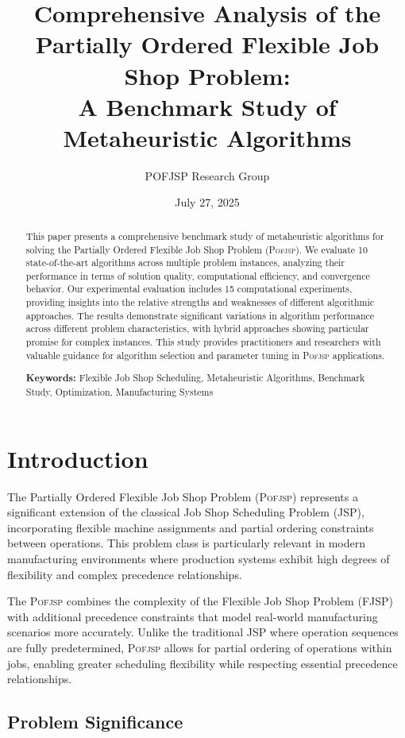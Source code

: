 \documentclass[11pt,a4paper]{article}
\title{Comprehensive Analysis of the Partially Ordered Flexible Job Shop Problem: \\
A Benchmark Study of Metaheuristic Algorithms}
\author{POFJSP Research Group}
\date{July 27, 2025}
\newcommand{\pofjsp}{\textsc{Pofjsp}}
\begin{document}
\maketitle


\begin{abstract}
This paper presents a comprehensive benchmark study of metaheuristic algorithms for solving the Partially Ordered Flexible Job Shop Problem (\pofjsp). We evaluate 10 state-of-the-art algorithms across multiple problem instances, analyzing their performance in terms of solution quality, computational efficiency, and convergence behavior. Our experimental evaluation includes 15 computational experiments, providing insights into the relative strengths and weaknesses of different algorithmic approaches. The results demonstrate significant variations in algorithm performance across different problem characteristics, with hybrid approaches showing particular promise for complex instances. This study provides practitioners and researchers with valuable guidance for algorithm selection and parameter tuning in \pofjsp{} applications.

\textbf{Keywords:} Flexible Job Shop Scheduling, Metaheuristic Algorithms, Benchmark Study, Optimization, Manufacturing Systems
\end{abstract}


\section{Introduction}

The Partially Ordered Flexible Job Shop Problem (\pofjsp) represents a significant extension of the classical Job Shop Scheduling Problem (JSP), incorporating flexible machine assignments and partial ordering constraints between operations. This problem class is particularly relevant in modern manufacturing environments where production systems exhibit high degrees of flexibility and complex precedence relationships.

The \pofjsp{} combines the complexity of the Flexible Job Shop Problem (FJSP) with additional precedence constraints that model real-world manufacturing scenarios more accurately. Unlike the traditional JSP where operation sequences are fully predetermined, \pofjsp{} allows for partial ordering of operations within jobs, enabling greater scheduling flexibility while respecting essential precedence relationships.

\subsection{Problem Significance}
\end{document}
